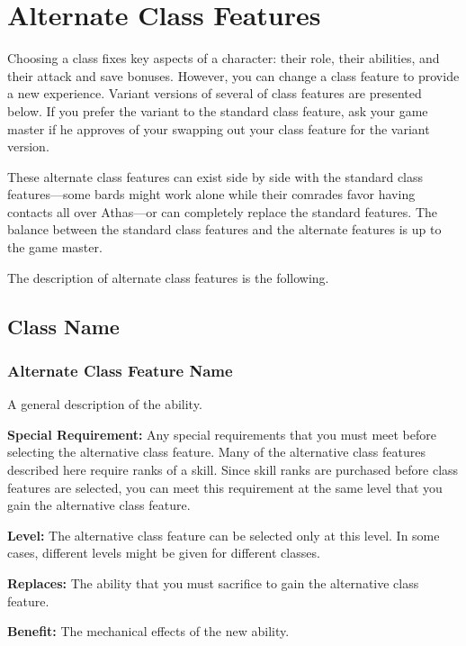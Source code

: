 \section{Alternate Class Features}
Choosing a class fixes key aspects of a character: their role, their abilities, and their attack and save bonuses. However, you can change a class feature to provide a new experience. Variant versions of several of class features are presented below. If you prefer the variant to the standard class feature, ask your game master if he approves of your swapping out your class feature for the variant version.

These alternate class features can exist side by side with the standard class features---some bards might work alone while their comrades favor having contacts all over Athas---or can completely replace the standard features. The balance between the standard class features and the alternate features is up to the game master.

The description of alternate class features is the following.

\subsection{Class Name}
\subsubsection{Alternate Class Feature Name}
A general description of the ability.

\textbf{Special Requirement:} Any special requirements that you must meet before selecting the alternative class feature. Many of the alternative class features described here require ranks of a skill. Since skill ranks are purchased before class features are selected, you can meet this requirement at the same level that you gain the alternative class feature.

\textbf{Level:} The alternative class feature can be selected only at this level. In some cases, different levels might be given for different classes.

\textbf{Replaces:} The ability that you must sacrifice to gain the alternative class feature.

\textbf{Benefit:} The mechanical effects of the new ability.

